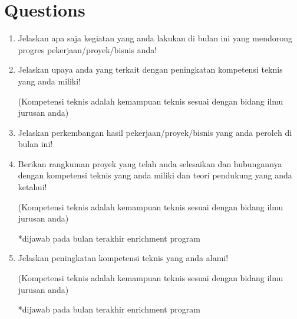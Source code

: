 \documentclass[12pt, letterpaper]{article}
\begin{document}
\section*{Questions}
\begin{enumerate}
    \item Jelaskan apa saja kegiatan yang anda lakukan di bulan ini yang mendorong progres pekerjaan/proyek/bisnis anda!
    \item Jelaskan upaya anda yang terkait dengan peningkatan kompetensi teknis yang anda miliki!
    
    (Kompetensi teknis adalah kemampuan teknis sesuai dengan bidang ilmu jurusan anda)
    \item Jelaskan perkembangan hasil pekerjaan/proyek/bisnis yang anda peroleh di bulan ini!
    \item Berikan rangkuman proyek yang telah anda selesaikan dan hubungannya dengan kompetensi teknis yang anda miliki dan teori pendukung yang anda ketahui!
    
    (Kompetensi teknis adalah kemampuan teknis sesuai dengan bidang ilmu jurusan anda)

    *dijawab pada bulan terakhir enrichment program
    \item Jelaskan peningkatan kompetensi teknis yang anda alami!
    
    (Kompetensi teknis adalah kemampuan teknis sesuai dengan bidang ilmu jurusan anda)
    
    *dijawab pada bulan terakhir enrichment program
\end{enumerate}
\end{document}
